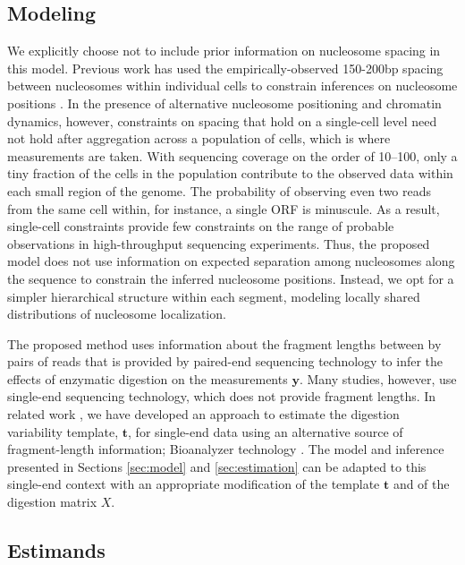 \subsection{Modeling}
\label{sec:remarksModeling}


We explicitly choose not to include prior information on nucleosome spacing in this model.
Previous work has used the empirically-observed 150-200bp spacing between nucleosomes within individual cells to constrain inferences on nucleosome positions \citep[e.g., see][]{Shivaswamy2008,Yuan2005}.
In the presence of alternative nucleosome positioning and chromatin dynamics, however, constraints on spacing that hold on a single-cell level need not hold after aggregation across a population of cells, which is where measurements are taken.
%
With sequencing coverage on the order of 10--100, only a tiny fraction of the cells in the population contribute to the observed data within each small region of the genome.
The probability of observing even two reads from the same cell within, for instance, a single ORF is minuscule.
As a result, single-cell constraints provide few constraints on the range of probable observations in high-throughput sequencing experiments.
%
Thus, the proposed model does not use information on expected separation among nucleosomes along the sequence to constrain the inferred nucleosome positions.
Instead, we opt for a simpler hierarchical structure within each segment, modeling locally shared distributions of nucleosome localization.


The proposed method uses information about the fragment lengths between by pairs of reads that is provided by paired-end sequencing technology to infer the effects of enzymatic digestion on the measurements $\bm{y}$.
Many studies, however, use single-end sequencing technology, which does not provide fragment lengths.
In related work \citep{Xu:Alex:Edo:Erin:2011}, we have developed an approach to estimate the digestion variability template, $\bm t$, for single-end data using an alternative source of fragment-length information; Bioanalyzer technology \citep[e.g.,][]{Mueller2000}.
The model and inference presented in Sections \ref{sec:model} and \ref{sec:estimation} can be adapted to this single-end context with an appropriate modification of the template $\bm t$ and of the digestion matrix $X$.

\subsection{Estimands}
\label{sec:remarksEstimands}

